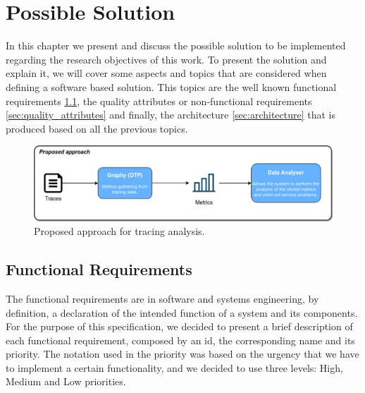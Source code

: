 \glsresetall
\chapter{Possible Solution}
\label{chap:possible_solution}

In this chapter we present and discuss the possible solution to be implemented regarding the research objectives of this work. To present the solution and explain it, we will cover some aspects and topics that are considered when defining a software based solution. This topics are the well known functional requirements \ref{sec:functional_requirements}, the quality attributes or non-functional requirements \ref{sec:quality_attributes} and finally, the architecture \ref{sec:architecture} that is produced based on all the previous topics.



\begin{figure}[!ht]
    \centering
    \includegraphics[width=1.00\textwidth]{images/system_composition.pdf}
    \caption{Proposed approach for tracing analysis.}
    \label{fig:proposed_approach_for_tracing_analysis}
\end{figure}

\section{Functional Requirements}
\label{sec:functional_requirements}

The functional requirements are in software and systems engineering, by definition, a declaration of the intended function of a system and its components. For the purpose of this specification, we decided to present a brief description of each functional requirement, composed by an id, the corresponding name and its priority. The notation used in the priority was based on the urgency that we have to implement a certain functionality, and we decided to use three levels: High, Medium and Low priorities.


